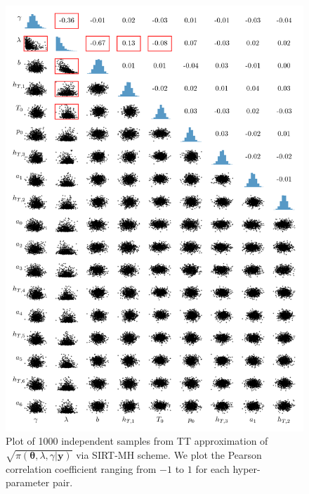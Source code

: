 \clearpage
\begin{figure}[h!]%
	\includegraphics[]{CorrPlot.png}
	\caption[Correlation plot of samples from TT approximation]{Plot of 1000 independent samples from TT approximation of $\sqrt{\pi( \bm{\theta},\lambda,\gamma  | \bm{y})}$ via SIRT-MH scheme. We plot the Pearson correlation coefficient ranging from $-1$ to $1$ for each hyper-parameter pair.}
	\label{fig:CorrPlot}
\end{figure}
